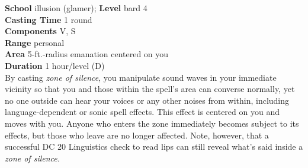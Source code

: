 \textbf{School} illusion (glamer); \textbf{Level} bard 4\\
\textbf{Casting Time} 1 round\\
\textbf{Components} V, S\\
\textbf{Range} personal\\
\textbf{Area} 5-ft.-radius emanation centered on you\\
\textbf{Duration} 1 hour/level (D)\\
By casting \textit{zone of silence}, you manipulate sound waves in your immediate vicinity so that you and those within the spell's area can converse normally, yet no one outside can hear your voices or any other noises from within, including language-dependent or sonic spell effects. This effect is centered on you and moves with you. Anyone who enters the zone immediately becomes subject to its effects, but those who leave are no longer affected. Note, however, that a successful DC 20 Linguistics check to read lips can still reveal what's said inside a \textit{zone of silence.}\\
